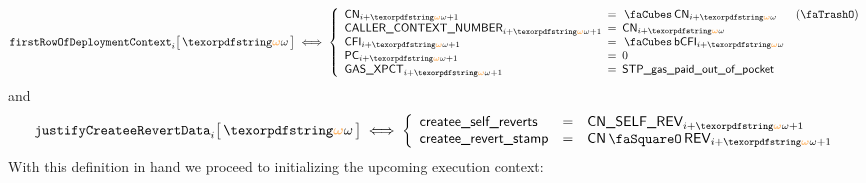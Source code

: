 	\[
		\firstRowOfDeployment {i}{\relof}
		\iff
		\left\{ \begin{array}{lclr}
			\cn            _{i + \relof + 1} & \!\!\! = \!\!\! & \cnCn       _{i + \relof}  & (\trash) \\
			\caller        _{i + \relof + 1} & \!\!\! = \!\!\! & \cn         _{i + \relof} \\
			\cfi           _{i + \relof + 1} & \!\!\! = \!\!\! & \cnCodeCfi  _{i + \relof} \\
			\pc            _{i + \relof + 1} & \!\!\! = \!\!\! & 0                         \\
			\gasExpected   _{i + \relof + 1} & \!\!\! = \!\!\! & \locStpGasPoop            \\
		\end{array} \right.
	\]
	and
	\[
		\justifyCreateeRevertData {i}{\relof}
		\iff
		\left\{ \begin{array}{lcl}
			\locCreateeSelfReverts & = & \cnSelfRev  _{i + \relof + 1} \\
			\locCreateeRevertStamp & = & \cnRevStamp _{i + \relof + 1} \\
		\end{array} \right.
	\]
	With this definition in hand we proceed to initializing the upcoming execution context:
